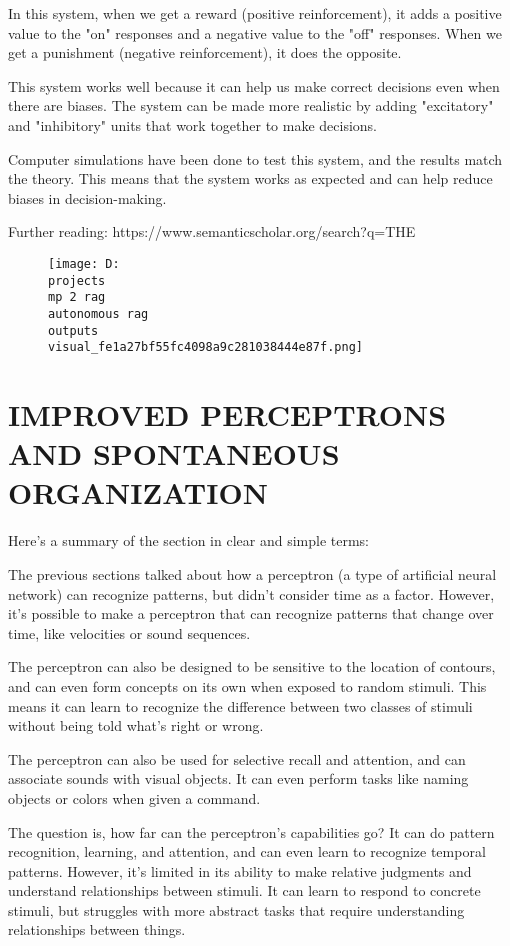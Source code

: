 \documentclass[12pt,a4paper]{article}
\begin{document}
In this system, when we get a reward (positive reinforcement), it adds a positive value to the "on" responses and a negative value to the "off" responses. When we get a punishment (negative reinforcement), it does the opposite.

This system works well because it can help us make correct decisions even when there are biases. The system can be made more realistic by adding "excitatory" and "inhibitory" units that work together to make decisions.

Computer simulations have been done to test this system, and the results match the theory. This means that the system works as expected and can help reduce biases in decision-making.

Further reading: https://www.semanticscholar.org/search?q=THE%
\begin{figure}[h]
\centering
\texttt{[image: D:\\projects\\mp 2 rag\\autonomous rag\\outputs\\visual\_fe1a27bf55fc4098a9c281038444e87f.png]}
\end{figure}
\section{IMPROVED PERCEPTRONS AND
SPONTANEOUS ORGANIZATION}
Here's a summary of the section in clear and simple terms:

The previous sections talked about how a perceptron (a type of artificial neural network) can recognize patterns, but didn't consider time as a factor. However, it's possible to make a perceptron that can recognize patterns that change over time, like velocities or sound sequences.

The perceptron can also be designed to be sensitive to the location of contours, and can even form concepts on its own when exposed to random stimuli. This means it can learn to recognize the difference between two classes of stimuli without being told what's right or wrong.

The perceptron can also be used for selective recall and attention, and can associate sounds with visual objects. It can even perform tasks like naming objects or colors when given a command.

The question is, how far can the perceptron's capabilities go? It can do pattern recognition, learning, and attention, and can even learn to recognize temporal patterns. However, it's limited in its ability to make relative judgments and understand relationships between stimuli. It can learn to respond to concrete stimuli, but struggles with more abstract tasks that require understanding relationships between things.
\end{document}
